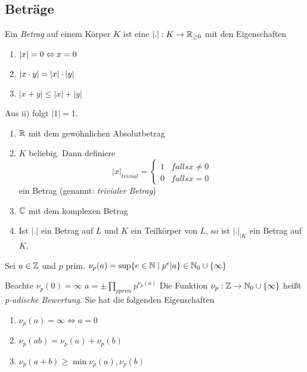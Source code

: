 \documentclass[../main.tex]{subfiles}
\begin{document}
\subsection{Beträge}
\begin{definition}
    Ein \emph{Betrag} auf einem Körper $K$ ist eine $\left\vert . \right\vert: K\rightarrow \mathbb{R}_{\geq0}$ mit den Eigenschaften
    \begin{enumerate}
        \item $\left\vert x \right\vert = 0 \Leftrightarrow x =0$
        \item $\left\vert x\cdot y \right\vert = |x| \cdot |y|$
        \item $|x+y| \leq |x| + |y|$
    \end{enumerate}
    Aus ii) folgt $|1| = 1$.
\end{definition}
\begin{example}
    \begin{enumerate}[label=\roman*)] %
        \item $\mathbb{R}$ mit dem gewöhnlichen Absolutbetrag
        \item $K$ beliebig. Dann definiere 
        $$|x|_{trivial} = \begin{cases}
            1 & falls x\neq 0\\
            0 & falls x= 0
        \end{cases}$$
        ein Betrag (genannt: \emph{trivialer Betrag})
        \item $\mathbb{C}$ mit dem komplexen Betrag
        \item Ist $|.|$ ein Betrag auf $L$ und $K$ ein Teilkörper von $L$, so ist $|.|_{|K}$ ein Betrag auf $K$.
    \end{enumerate}
\end{example}
\begin{definition} 
    Sei $a\in \mathbb{Z}$ und $p$ prim.
    $\nu_p(a)= \sup\{e\in \mathbb{N}\mid p^e|a\}\in \mathbb{N}_0\cup \{\infty\}$
\end{definition}
Beachte $\nu_p(0) = \infty$
$a = \pm \prod_{p prim} p^{\nu_p(a)}$
Die Funktion $\nu_p:\mathbb{Z}\rightarrow \mathbb{N}_0\cup \{\infty\}$ heißt \emph{p-adische Bewertung}. Sie hat die folgenden Eigenschaften
\begin{enumerate}[label=\roman*)]%
    \item $\nu_p(a) = \infty \Leftrightarrow a = 0$
    \item $\nu_p(ab) = \nu_p(a)+\nu_p(b)$
    \item $\nu_p(a+b) \geq \min{\nu_p(a),\nu_p(b)}$
\end{enumerate}
\end{document}

